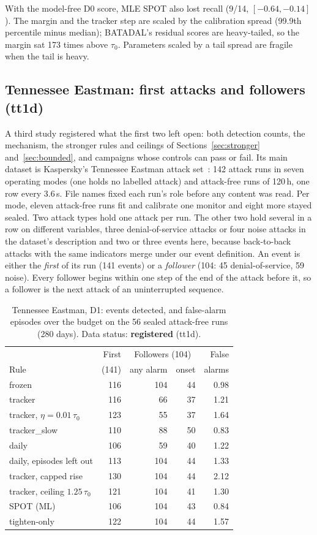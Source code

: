 \documentclass[sigconf]{acmart}
\begin{document}
With the model-free D0 score, MLE SPOT also lost recall (9/14, $[-0.64, -0.14]$). The margin and the
tracker step are scaled by the calibration spread (99.9th percentile minus median); BATADAL's
residual scores are heavy-tailed, so the margin sat 173 times above $\tau_0$. Parameters scaled by a
tail spread are fragile when the tail is heavy.


\subsection{Tennessee Eastman: first attacks and followers (tt1d)}
\label{sec:tep}

A third study registered what the first two left open: both detection counts, the mechanism, the
stronger rules and ceilings of Sections~\ref{sec:stronger} and~\ref{sec:bounded}, and campaigns whose
controls can pass or fail. Its main dataset is Kaspersky's Tennessee Eastman attack
set~\cite{filonov2017tep, downs1993tep}: 142 attack runs in seven operating modes (one holds no
labelled attack) and attack-free runs of 120\,h, one row every 3.6\,s. File names fixed each run's role
before any content was read. Per mode, eleven attack-free runs fit and calibrate one monitor and eight
more stayed sealed. Two attack types hold one attack per run. The other two hold several in a row on
different variables, three denial-of-service attacks or four noise attacks in the dataset's
description and two or three events here, because back-to-back attacks with the same indicators merge
under our event definition. An event is either the \emph{first} of its run (141 events) or a
\emph{follower} (104: 45 denial-of-service, 59 noise). Every follower begins within one step of the end
of the attack before it, so a follower is the next attack of an uninterrupted sequence.

\begin{table}[t]
\caption{Tennessee Eastman, D1: events detected, and false-alarm episodes over the budget on the 56
sealed attack-free runs (280 days). Data status: \textbf{registered} (tt1d).}
\label{tab:tep}
\small
\begin{tabular}{@{}lrrrr@{}}
\toprule
 & First & \multicolumn{2}{c}{Followers (104)} & False \\
Rule & (141) & any alarm & onset & alarms \\
\midrule
frozen & 116 & 104 & 44 & 0.98 \\
tracker & 116 & 66 & 37 & 1.21 \\
tracker, $\eta = 0.01\,\tau_0$ & 123 & 55 & 37 & 1.64 \\
tracker\_slow & 110 & 88 & 50 & 0.83 \\
daily & 106 & 59 & 40 & 1.22 \\
daily, episodes left out & 113 & 104 & 44 & 1.33 \\
tracker, capped rise & 130 & 104 & 44 & 2.12 \\
tracker, ceiling $1.25\,\tau_0$ & 121 & 104 & 41 & 1.30 \\
SPOT (ML) & 106 & 104 & 43 & 0.84 \\
tighten-only & 122 & 104 & 44 & 1.57 \\
\bottomrule
\end{tabular}
\end{table}
\end{document}
